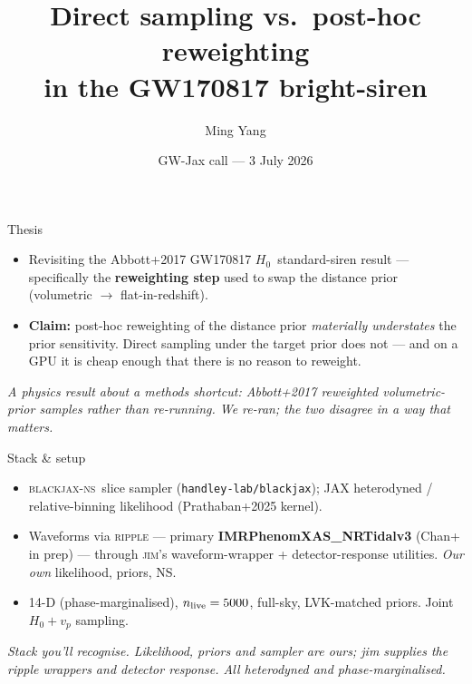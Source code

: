 \documentclass[aspectratio=169,10pt]{beamer}
\title[GW170817 prior sensitivity]{Direct sampling vs.\ post-hoc reweighting\\in the GW170817 bright-siren \hzero}
\author{Ming Yang}
\institute{Yang, Prathaban, Yallup \& Handley}
\date{GW-Jax call --- 3 July 2026}
\newcommand{\hzero}{\ensuremath{H_{0}}}
\newcommand{\IMRX}{IMRPhenomXAS\_NRTidalv3}
\newcommand{\bjns}{\textsc{blackjax-ns}}
\begin{document}
\begin{frame}
  \titlepage
\end{frame}

\begin{frame}{Thesis}
  \begin{itemize}
    \item Revisiting the Abbott+2017 GW170817 \hzero\ standard-siren result --- specifically the \textbf{reweighting step} used to swap the distance prior (volumetric $\to$ flat-in-redshift).
    \vfill
    \item \textbf{Claim:} post-hoc reweighting of the distance prior \emph{materially understates} the prior sensitivity. Direct sampling under the target prior does not --- and on a GPU it is cheap enough that there is no reason to reweight.
  \end{itemize}
  \vfill
  \footnotesize\textit{A physics result about a methods shortcut: Abbott+2017 reweighted volumetric-prior samples rather than re-running. We re-ran; the two disagree in a way that matters.}
\end{frame}

\begin{frame}{Stack \& setup}
  \begin{itemize}
    \item \bjns\ slice sampler (\texttt{handley-lab/blackjax}); JAX heterodyned / relative-binning likelihood (Prathaban+2025 kernel).
    \item Waveforms via \textsc{ripple} --- primary \textbf{\IMRX} (Chan+ in prep) --- through \textsc{jim}'s waveform-wrapper + detector-response utilities. \emph{Our own} likelihood, priors, NS.
    \item 14-D (phase-marginalised), $n_{\rm live}=5000$, full-sky, LVK-matched priors. Joint $\hzero + v_p$ sampling.
  \end{itemize}
  \vfill
  \footnotesize\textit{Stack you'll recognise. Likelihood, priors and sampler are ours; jim supplies the ripple wrappers and detector response. All heterodyned and phase-marginalised.}
\end{frame}
\end{document}
